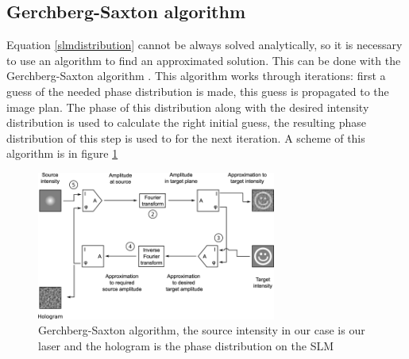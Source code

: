 \documentclass[a4paper,10pt]{article}
\begin{document}
\subsection{Gerchberg-Saxton algorithm}
Equation \eqref{slmdistribution} cannot be always solved analytically, so it is necessary to use an algorithm to find an approximated solution. This can be done with the Gerchberg-Saxton algorithm \cite{algorithm}. This algorithm works through iterations: first a guess of the needed phase distribution is made, this guess is propagated to the image plan. The phase of this distribution along with the desired intensity distribution is used to calculate the right initial guess, the resulting phase distribution of this step is used to for the next iteration. A scheme of this algorithm is in figure \ref{gs} 
\begin{figure}[H]
\centering
\includegraphics[width=0.7\textwidth]{GS-diagram}
\caption{Gerchberg-Saxton algorithm, the source intensity in our case is our laser and the hologram is the phase distribution on the SLM}\label{gs}
\end{figure}
\end{document}
